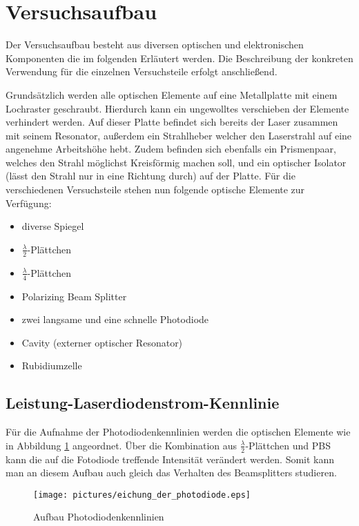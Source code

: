 \documentclass[12pt]{article}
\begin{document}
\section{Versuchsaufbau}
Der Versuchsaufbau besteht aus diversen optischen und elektronischen Komponenten die im folgenden Erläutert werden.
Die Beschreibung der konkreten Verwendung für die einzelnen Versuchsteile erfolgt anschließend.

Grundsätzlich werden alle optischen Elemente auf eine Metallplatte mit einem Lochraster geschraubt. Hierdurch kann ein ungewolltes verschieben der Elemente verhindert werden. Auf dieser Platte befindet sich bereits der Laser zusammen mit seinem Resonator, außerdem ein Strahlheber welcher den Laserstrahl auf eine angenehme Arbeitshöhe hebt. Zudem befinden sich ebenfalls ein Prismenpaar, welches den Strahl möglichst Kreisförmig machen soll, und ein optischer Isolator (lässt den Strahl nur in eine Richtung durch) auf der Platte. Für die verschiedenen Versuchsteile stehen nun folgende optische Elemente zur Verfügung:
\begin{itemize}
 \item diverse Spiegel
 \item $\frac{\lambda}{2}$-Plättchen
 \item $\frac{\lambda}{4}$-Plättchen
 \item Polarizing Beam Splitter
 \item zwei langsame und eine schnelle Photodiode
 \item Cavity (externer optischer Resonator)
 \item Rubidiumzelle
\end{itemize}
\newpage 
\subsection{Leistung-Laserdiodenstrom-Kennlinie}
Für die Aufnahme der Photodiodenkennlinien werden die optischen Elemente wie in Abbildung \ref{skizze-pd} angeordnet.
Über die Kombination aus $\frac{\lambda}{2}$-Plättchen und PBS kann die auf die Fotodiode treffende Intensität verändert werden. Somit kann man an diesem Aufbau auch gleich das Verhalten des Beamsplitters studieren.
\begin{figure}[H]
 \texttt{[image: pictures/eichung\_der\_photodiode.eps]}
 \caption{Aufbau Photodiodenkennlinien}
 \label{skizze-pd}
\end{figure}
\newpage
\end{document}
